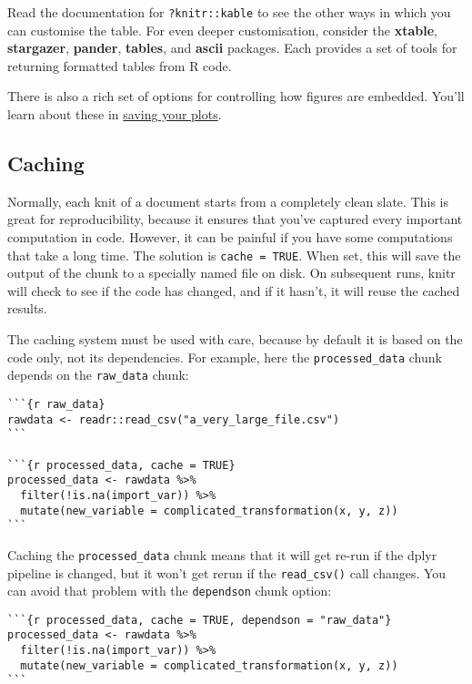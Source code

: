 \documentclass[]{book}
\begin{document}
Read the documentation for \texttt{?knitr::kable} to see the other ways
in which you can customise the table. For even deeper customisation,
consider the \textbf{xtable}, \textbf{stargazer}, \textbf{pander},
\textbf{tables}, and \textbf{ascii} packages. Each provides a set of
tools for returning formatted tables from R code.

There is also a rich set of options for controlling how figures are
embedded. You'll learn about these in
\protect\hyperlink{saving-your-plots}{saving your plots}.

\subsection{Caching}\label{caching}

Normally, each knit of a document starts from a completely clean slate.
This is great for reproducibility, because it ensures that you've
captured every important computation in code. However, it can be painful
if you have some computations that take a long time. The solution is
\texttt{cache\ =\ TRUE}. When set, this will save the output of the
chunk to a specially named file on disk. On subsequent runs, knitr will
check to see if the code has changed, and if it hasn't, it will reuse
the cached results.

The caching system must be used with care, because by default it is
based on the code only, not its dependencies. For example, here the
\texttt{processed\_data} chunk depends on the \texttt{raw\_data} chunk:

\begin{verbatim}
```{r raw_data}
rawdata <- readr::read_csv("a_very_large_file.csv")
```

```{r processed_data, cache = TRUE}
processed_data <- rawdata %>% 
  filter(!is.na(import_var)) %>% 
  mutate(new_variable = complicated_transformation(x, y, z))
```
\end{verbatim}

Caching the \texttt{processed\_data} chunk means that it will get re-run
if the dplyr pipeline is changed, but it won't get rerun if the
\texttt{read\_csv()} call changes. You can avoid that problem with the
\texttt{dependson} chunk option:

\begin{verbatim}
```{r processed_data, cache = TRUE, dependson = "raw_data"}
processed_data <- rawdata %>% 
  filter(!is.na(import_var)) %>% 
  mutate(new_variable = complicated_transformation(x, y, z))
```
\end{verbatim}
\end{document}
